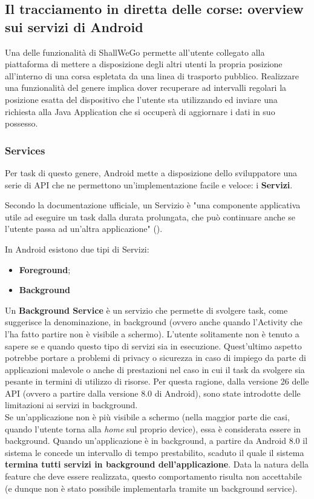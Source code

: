         \subsection{Il tracciamento in diretta delle corse: overview sui servizi di Android}
            Una delle funzionalità di ShallWeGo permette all'utente collegato alla piattaforma di mettere a disposizione degli altri utenti la propria posizione all'interno di una corsa espletata da una linea di trasporto pubblico.
            Realizzare una funzionalità del genere implica dover recuperare ad intervalli regolari la posizione esatta del dispositivo che l'utente sta utilizzando ed inviare una richiesta alla Java Application che si occuperà di aggiornare i dati in suo possesso.
            
            \subsubsection{Services}
                Per task di questo genere, Android mette a disposizione dello sviluppatore una serie di API che ne permettono un'implementazione facile e veloce: i \textbf{Servizi}.

                Secondo la documentazione ufficiale, un Servizio è "una componente applicativa utile ad eseguire un task dalla durata prolungata, che può continuare anche se l'utente passa ad un'altra applicazione" (\cite{AndroidDocService}).

                In Android esistono due tipi di Servizi: 

                \begin{itemize}
                    \item \textbf{Foreground};
                    \item \textbf{Background} 
                \end{itemize}

                Un \textbf{Background Service} è un servizio che permette di svolgere task, come suggerisce la denominazione, in background (ovvero anche quando l'Activity che l'ha fatto partire non è visibile a schermo). L'utente solitamente non è tenuto a sapere se e quando questo tipo di servizi sia in esecuzione. Quest'ultimo aspetto potrebbe portare a problemi di privacy o sicurezza in caso di impiego da parte di applicazioni malevole o anche di prestazioni nel caso in cui il task da svolgere sia pesante in termini di utilizzo di risorse. Per questa ragione, dalla versione 26 delle API (ovvero a partire dalla versione 8.0 di Android), sono state introdotte delle limitazioni ai servizi in background. \\
                Se un'applicazione non è più visibile a schermo (nella maggior parte die casi, quando l'utente torna alla \textit{home} sul proprio device), essa è considerata essere in background. Quando un'applicazione è in background, a partire da Android 8.0 il sistema le concede un intervallo di tempo prestabilito, scaduto il quale il sistema \textbf{termina tutti servizi in background dell'applicazione}. Data la natura della feature che deve essere realizzata, questo comportamento risulta non accettabile (e dunque non è stato possibile implementarla tramite un background service).
                
